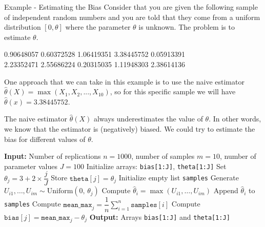 \documentclass[8pt]{beamer}
\begin{document}
\begin{frame}{Example - Estimating the Bias} 
Consider that you are given the following sample of independent random numbers and you are told that they come from a uniform distribution $[0, \theta]$ where the parameter $\theta$ is unknown. The problem is to estimate $\theta$.
\vspace{2mm}

0.90648057    \hspace{1mm} 0.60372528  \hspace{1mm}
1.06419351   \hspace{1mm} 3.38445752  \hspace{1mm}
0.05913391 \hspace{1mm} \\
2.23352471 \hspace{1mm}
2.55686224 \hspace{1mm}  0.20315035 \hspace{1mm}
1.11948303 \hspace{1mm} 2.38614136
\vspace{2mm}
\pause

One approach that we can take in this example is to use the naive estimator $\hat{\theta}(X)=\max(X_1,X_2,...,X_{10})$, so for this specific sample we will have $\hat{\theta}(x)=3.38445752$.
\vspace{2mm}

The naive estimator  $\hat{\theta}(X)$ always underestimates the value of $\theta$. In other words, we know that the estimator is (negatively) biased. We could try to estimate the bias for different values of $\theta$.
\end{frame}

\begin{frame}[fragile]
\begin{algorithm}[H]
\caption{Monte Carlo Bias Estimation for $\hat{\theta} = \max(U_1, \ldots, U_m)$}
\begin{algorithmic}[1]
  \State \textbf{Input:} Number of replications $n = 1000$, number of samples $m = 10$, number of parameter values $J = 100$
  \State Initialize arrays: \texttt{bias[1:J]}, \texttt{theta[1:J]}
    \State Set $\theta_j = 3 + 2 \times \dfrac{j}{J}$
    \State Store $\texttt{theta}[j] = \theta_j$
    \State Initialize empty list \texttt{samples}
      \State Generate $U_{i1}, \ldots, U_{im} \sim \text{Uniform}(0,\, \theta_j)$
      \State Compute $\hat{\theta}_i = \max(U_{i1}, \ldots, U_{im})$
      \State Append $\hat{\theta}_i$ to \texttt{samples}
    \EndFor
    \State Compute $\texttt{mean\_max}_j = \dfrac{1}{n} \sum_{i=1}^n \texttt{samples}[i]$
    \State Compute $\texttt{bias}[j] = \texttt{mean\_max}_j - \theta_j$
  \EndFor
  \State \textbf{Output:} Arrays \texttt{bias[1:J]} and \texttt{theta[1:J]}
\end{algorithmic}
\end{algorithm}
\end{frame}
\end{document}
